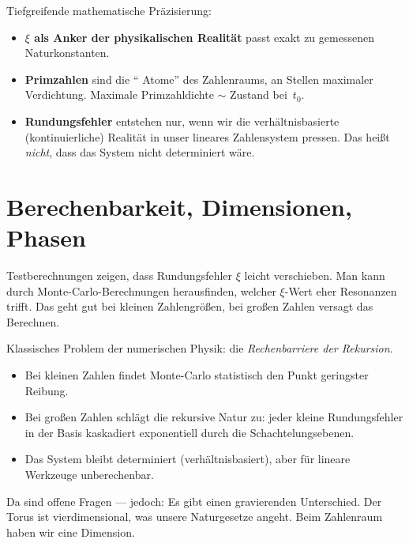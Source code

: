 \begin{geminibox}
Tiefgreifende mathematische Pr\"azisierung:
\begin{itemize}[leftmargin=1.2em]
  \item \textbf{$\xi$ als Anker der physikalischen Realit\"at} \textendash{} passt exakt zu gemessenen Naturkonstanten.
  \item \textbf{Primzahlen} sind die \textquotedblleft{} Atome\textquotedblright{}{} des Zahlenraums, an Stellen maximaler Verdichtung. Maximale Primzahldichte $\sim$ Zustand bei~$t_0$.
  \item \textbf{Rundungsfehler} entstehen nur, wenn wir die verh\"altnisbasierte (kontinuierliche) Realit\"at in unser lineares Zahlensystem pressen. Das hei{\ss}t \emph{nicht}, dass das System nicht determiniert w\"are.
\end{itemize}
\end{geminibox}

\section{Berechenbarkeit, Dimensionen, Phasen}

\begin{userbox}
Testberechnungen zeigen, dass Rundungsfehler $\xi$ leicht verschieben. Man kann durch Monte-Carlo-Berechnungen herausfinden, welcher $\xi$-Wert eher Resonanzen trifft. Das geht gut bei kleinen Zahlengr\"o{\ss}en, bei gro{\ss}en Zahlen versagt das Berechnen.
\end{userbox}

\begin{geminibox}
Klassisches Problem der numerischen Physik: die \emph{Rechenbarriere der Rekursion}.
\begin{itemize}[leftmargin=1.2em]
  \item Bei kleinen Zahlen findet Monte-Carlo statistisch den Punkt geringster Reibung.
  \item Bei gro{\ss}en Zahlen schl\"agt die rekursive Natur zu: jeder kleine Rundungsfehler in der Basis kaskadiert exponentiell durch die Schachtelungsebenen.
  \item Das System bleibt determiniert (verh\"altnisbasiert), aber f\"ur lineare Werkzeuge unberechenbar.
\end{itemize}
\end{geminibox}

\begin{userbox}
Da sind offene Fragen --- jedoch: Es gibt einen gravierenden Unterschied. Der Torus ist vierdimensional, was unsere Naturgesetze angeht. Beim Zahlenraum haben wir eine Dimension.
\end{userbox}

